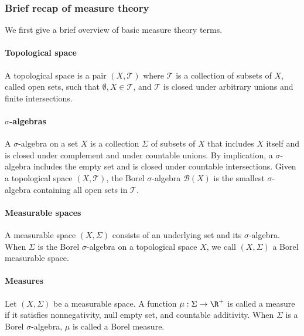 
\subsubsection{Brief recap of measure theory} 
We first give a brief overview of basic measure theory terms.

\paragraph{Topological space} A topological space is a pair $(X, \mathcal{T})$ where $\mathcal{T}$ is a collection of subsets of $X$, called open sets, such that $\emptyset, X \in \mathcal{T}$, and $\mathcal{T}$ is closed under arbitrary unions and finite intersections.

\paragraph{$\sigma$-algebras} A $\sigma$-algebra on a set $X$ is a collection $\Sigma$ of subsets of $X$ that includes $X$ itself and is closed under complement and under countable unions. By implication, a $\sigma$-algebra includes the empty set and is closed under countable intersections. 
Given a topological space $(X, \mathcal{T})$, the Borel $\sigma$-algebra $\mathcal{B}(X)$ is the smallest $\sigma$-algebra containing all open sets in $\mathcal{T}$.

\paragraph{Measurable spaces} A measurable space $(X, \Sigma)$ consists of an underlying set and its $\sigma$-algebra.  
When $\Sigma$ is the Borel $\sigma$-algebra on a topological space $X$, we call $(X, \Sigma)$ a Borel measurable space.

\paragraph{Measures} Let $(X,\Sigma)$ be a measurable space. A function $\mu : \Sigma \to \R^+$ is called a measure if it satisfies nonnegativity, null empty set, and countable additivity. 
When $\Sigma$ is a Borel $\sigma$-algebra, $\mu$ is called a Borel measure.

